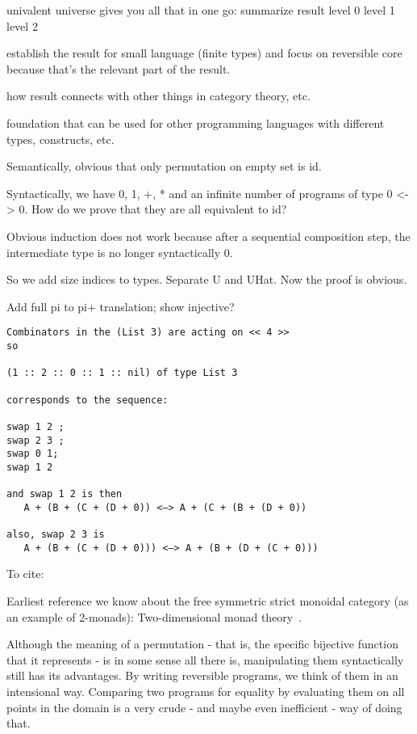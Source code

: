 
univalent universe gives you all that in one go: summarize result
level 0
level 1
level 2

establish the result for small language (finite types) and focus on reversible
core because that's the relevant part of the result.

how result connects with other things in category theory, etc.

foundation that can be used for other programming languages with different
types, constructs, etc.


Semantically, obvious that only permutation on empty set is id.

Syntactically, we have 0, 1, +, *  and an infinite number of programs of type 0
<-> 0. How do we prove that they are all equivalent to id?

Obvious induction does not work because after a sequential composition step, the
intermediate type is no longer syntactically 0.

So we add size indices to types. Separate U and UHat. Now the proof is obvious.


Add full pi to pi+ translation; show injective?

\begin{verbatim}
Combinators in the (List 3) are acting on << 4 >>
so

(1 :: 2 :: 0 :: 1 :: nil) of type List 3

corresponds to the sequence:

swap 1 2 ;
swap 2 3 ;
swap 0 1;
swap 1 2

and swap 1 2 is then
   A + (B + (C + (D + 0)) <—> A + (C + (B + (D + 0))

also, swap 2 3 is
   A + (B + (C + (D + 0))) <—> A + (B + (D + (C + 0)))
\end{verbatim}

To cite:

Earliest reference we know about the free symmetric strict monoidal category (as an example of 2-monads):
Two-dimensional monad theory~\cite{blackwellTwodimensionalMonadTheory1989}.


Although the meaning of a permutation - that is, the specific bijective function
that it represents - is in some sense all there is, manipulating them
syntactically still has its advantages. By writing reversible programs, we think
of them in an intensional way. Comparing two programs for equality by evaluating
them on all points in the domain is a very crude - and maybe even inefficient -
way of doing that.

